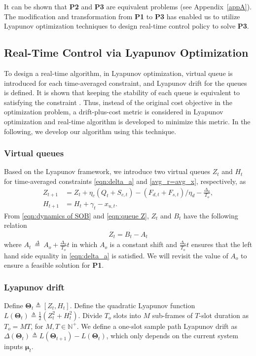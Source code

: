 \documentclass[journal]{IEEEtran}
\def\mubf{\boldsymbol \mu }
\def\Thetabf{\boldsymbol \Theta}
\def\defeq{~{\stackrel{\Delta}{=}}~}
\begin{document}
It can be shown that {\bf P2} and {\bf P3} are equivalent problems (see Appendix~\ref{appA}).
The modification and transformation from {\bf P1} to {\bf P3} has enabled us to utilize Lyapunov optimization techniques  \cite{book:Neely} to design real-time control policy to solve {\bf P3}.


\subsection{Real-Time Control via Lyapunov Optimization}

To design a real-time algorithm, in Lyapunov optimization, virtual queue is introduced for each time-averaged constraint, and Lyapunov drift for the queues is defined. It is shown that keeping the stability of each queue is equivalent to satisfying the constraint \cite{book:Neely}. Thus, instead of the original cost objective in the optimization problem, a drift-plus-cost metric is considered  in Lyapunov optimization and real-time algorithm is developed to minimize this metric. In the following, we develop our algorithm using this technique.

\subsubsection{Virtual queues}
Based on the Lyapunov framework, we introduce two virtual queues $Z_t$ and $H_t$ for time-averaged constraints \eqref{eqn:delta_a} and \eqref{avg_r=avg_x}, respectively, as
\begin{align}
Z_{t+1}&=Z_t+\eta_c(Q_t+S_{c,t})-(F_{d,t}+F_{s,t})/\eta_d-\frac{\Delta_a}{T_o}, \label{eqn:queue Z}\\
H_{t+1}&=H_t+\gamma_t-x_{u,t}. \label{eqn:queue H}
\end{align}
From \eqref{eqn:dynamics of SOB} and \eqref{eqn:queue Z}, $Z_t$ and $B_t$ have the following relation
\begin{align}\label{eqn:dynamic shift Z}
Z_t=B_t-A_t
\end{align}
where $A_t\defeq A_o+\frac{\Delta_a}{T_o}t$ in which  $A_o$ is a constant shift and $\frac{\Delta_a}{T_o}t$  ensures that the left hand side equality in \eqref{eqn:delta_a} is satisfied.
We will revisit the value of $A_o$ to  ensure a feasible solution for {\bf P1}.

\subsubsection{Lyapunov drift}
Define $\Thetabf_t\triangleq[Z_t, H_t]$. Define the quadratic Lyapunov function  $L(\Thetabf_t)\triangleq\frac{1}{2}(Z_t^2+H_t^2)$. Divide $T_o$ slots into $M$ sub-frames of $T$-slot duration as $T_o=MT$, for  $M,T\in \mathbb{N}^+$. We define a one-slot sample path Lyapunov drift as $\Delta(\Thetabf_t)\triangleq L\left(\Thetabf_{t+1}\right)-L(\Thetabf_{t})$, which only depends on the current system inputs $\mubf_t$.
\end{document}
